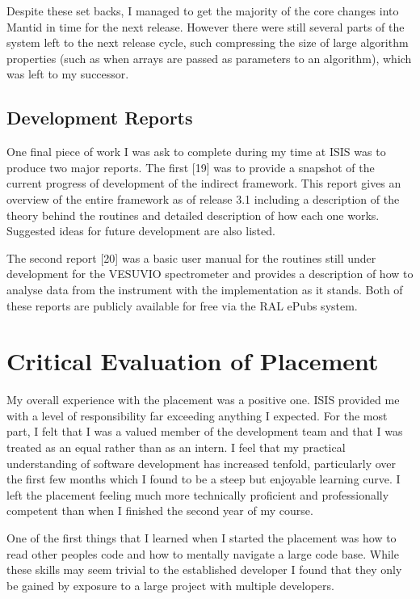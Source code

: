 \documentclass[paper=a4, fontsize=11pt]{scrartcl}	%
\numberwithin{equation}{section}															%
\numberwithin{figure}{section}																%
\numberwithin{table}{section}
\begin{document}
Despite these set backs, I managed to get the majority of the core
changes into Mantid in time for the next release. However there were
still several parts of the system left to the next release cycle, such
compressing the size of large algorithm properties (such as when arrays
are passed as parameters to an algorithm), which was left to my
successor.

\subsection{Development Reports}\label{development-reports}

One final piece of work I was ask to complete during my time at ISIS was
to produce two major reports. The first {[}19{]} was to provide a snapshot of the
current progress of development of the indirect framework. This report
gives an overview of the entire framework as of release 3.1 including a
description of the theory behind the routines and detailed description
of how each one works. Suggested ideas for future development are also
listed.

The second report {[}20{]} was a basic user manual for the routines still under
development for the VESUVIO spectrometer and provides a description of
how to analyse data from the instrument with the implementation as it
stands. Both of these reports are publicly available for free via the RAL ePubs system.

\clearpage
\section{Critical Evaluation of
Placement}\label{critical-evaluation-of-placement}

My overall experience with the placement was a positive one. ISIS provided me with a level of responsibility far exceeding
anything I expected. For the most part, I felt that I was a valued member
of the development team and that I was treated as an equal rather than
as an intern. I feel that my practical understanding of software
development has increased tenfold, particularly over the first few
months which I found to be a steep but enjoyable learning curve. I left
the placement feeling much more technically proficient and
professionally competent than when I finished the second year of my
course.

One of the first things that I learned when I started the placement was
how to read other peoples code and how to mentally navigate a large code
base. While these skills may seem trivial to the established developer I
found that they only be gained by exposure to a large project with multiple developers.
\end{document}
